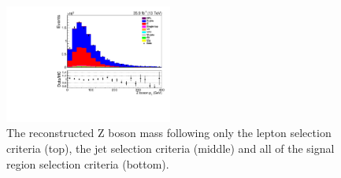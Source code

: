 \begin{figure}[ht]
\includegraphics[width=0.49\textwidth]{figs/background-estimation/plots/unblinded/prompt_mumu_ttbarInc/zPairPt_NPL_mumu_wMass_mumu.pdf}
\caption{
The reconstructed Z boson mass \pT following only the lepton selection criteria (top), the jet selection criteria (middle) and all of the signal region selection criteria (bottom).
}
\label{fig:App_SR_zBosonPt}
\end{figure}

